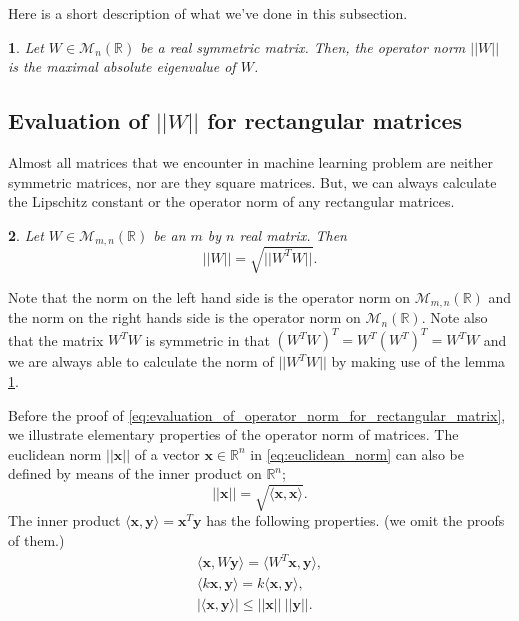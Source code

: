 \documentclass[12pt]{report}
\numberwithin{figure}{chapter}
\theoremstyle{plain}
\newtheorem{theorem}{\protect\theoremname}[chapter]
\theoremstyle{definition}
\theoremstyle{corollary}
\theoremstyle{definition}
\theoremstyle{plain}
\theoremstyle{definition}
\theoremstyle{plain}
\newtheorem{lemma}[theorem]{\protect\lemmaname}
\providecommand{\lemmaname}{Lemma}
\providecommand{\theoremname}{Theorem}
\newcommand\bx{\ensuremath{\boldsymbol x}}
\newcommand\by{\ensuremath{\boldsymbol y}}
\begin{document}
Here is a short description of what we've done in this subsection.
\begin{lemma}\label{lemm:evaluation_for_square_matrices}
Let \(W\in\mathcal M_n(\mathbb R)\) be a real symmetric matrix.
Then, the operator norm \(||W||\) is the maximal absolute eigenvalue of \(W\).
\end{lemma}

%
\subsection{Evaluation of \(||W||\) for rectangular matrices}\label{sec:evaluation_for_rectangular_matrices}
Almost all matrices that we encounter in machine learning problem are neither symmetric matrices, nor are they square matrices.
But, we can always calculate the Lipschitz constant or the operator norm of any rectangular matrices.

\begin{theorem}\label{theo:evaluation_for_rectangular_matrices}
\cite{KC}
Let \(W\in\mathcal M_{m,n}(\mathbb R)\) be an \(m\) by \(n\) real matrix.
Then
\begin{equation}\label{eq:evaluation_of_operator_norm_for_rectangular_matrix}
||W||=\sqrt{||W^TW||}.
\end{equation}
\end{theorem}

Note that the norm on the left hand side is the operator norm on \(\mathcal M_{m,n}(\mathbb R)\) and the norm on the right hands side is the operator norm on \(\mathcal M_n(\mathbb R)\).
Note also that the matrix \(W^TW\) is symmetric in that \((W^TW)^T=W^T(W^T)^T=W^TW\) and we are always able to calculate the norm of \(||W^TW||\) by making use of the lemma \ref{lemm:evaluation_for_square_matrices}.

Before the proof of \eqref{eq:evaluation_of_operator_norm_for_rectangular_matrix}, we illustrate elementary properties of the operator norm of matrices.
The euclidean norm \(||\bx||\) of a vector \(\bx\in\mathbb R^n\) in \eqref{eq:euclidean_norm} can also be defined by means of the inner product on \(\mathbb R^n\);
\begin{equation}\label{eq:euclidean norm_2}
||\bx||=\sqrt{\langle \bx,\bx\rangle}.
\end{equation}
The inner product \(\langle \bx,\by\rangle=\bx^T\by\) has the following properties. (we omit the proofs of them.)
\begin{gather*}
\langle \bx,W\by\rangle=\langle W^T\bx,\by\rangle,\\
\langle k\bx,\by\rangle=k\langle \bx,\by\rangle,\\
|\langle\bx,\by\rangle|\le||\bx||\:||\by||.
\end{gather*}
\end{document}
